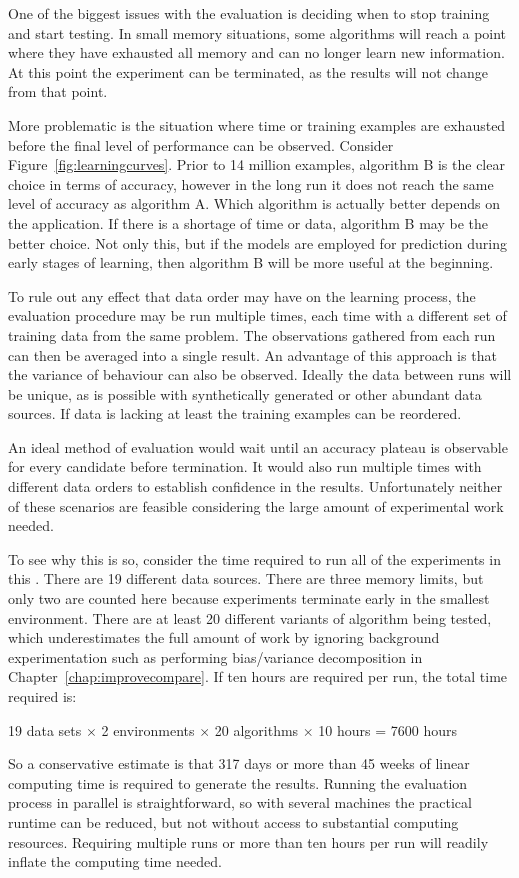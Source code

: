 One of the biggest issues with the evaluation is deciding when to stop training and start testing. In small memory situations, some algorithms will reach a point where they have exhausted all memory and can no longer learn new information. At this point the experiment can be terminated, as the results will not change from that point.

More problematic is the situation where time or training examples are exhausted before the final level of performance can be observed.
Consider Figure~\ref{fig:learningcurves}. Prior to 14 million examples, algorithm B is the clear choice in terms of accuracy, however in the long run it does not reach the same level of accuracy as algorithm A. Which algorithm is actually better depends on the application. If there is a shortage of time or data, algorithm B may be the better choice. Not only this, but if the models are employed for prediction during early stages of learning, then algorithm B will be more useful at the beginning.

To rule out any effect that data order may have on the learning process, the evaluation procedure may be run multiple times, each time with a different set of training data from the same problem. The observations gathered from each run can then be averaged into a single result. An advantage of this approach is that the variance of behaviour can also be observed. Ideally the data between runs will be unique, as is possible with synthetically generated or other abundant data sources. If data is lacking at least the training examples can be reordered.

An ideal method of evaluation would wait until an accuracy plateau is observable for every candidate before termination. It would also run multiple times with different data orders to establish confidence in the results. Unfortunately neither of these scenarios are feasible considering the large amount of experimental work needed. %

\BEGINOMIT
To see why this is so, consider the time required to run all of the experiments in this \thesisc. There are 19 different data sources. There are three memory limits, but only two are counted here because experiments terminate early in the smallest environment. There are at least 20 different variants of algorithm being tested, which underestimates the full amount of work by ignoring background experimentation such as performing bias/variance decomposition in Chapter~\ref{chap:improvecompare}.
If ten hours are required per run, the total time required is:
\begin{center}
19 data sets $\times$ 2 environments $\times$ 20 algorithms $\times$ 10 hours = 7600 hours
\end{center}
So a conservative estimate is that 317 days or more than 45 weeks of linear computing time is required to generate the results. Running the evaluation process in parallel is straightforward, so with several machines the practical runtime can be reduced, but not without access to substantial computing resources. Requiring multiple runs or more than ten hours per run will readily inflate the computing time needed.

